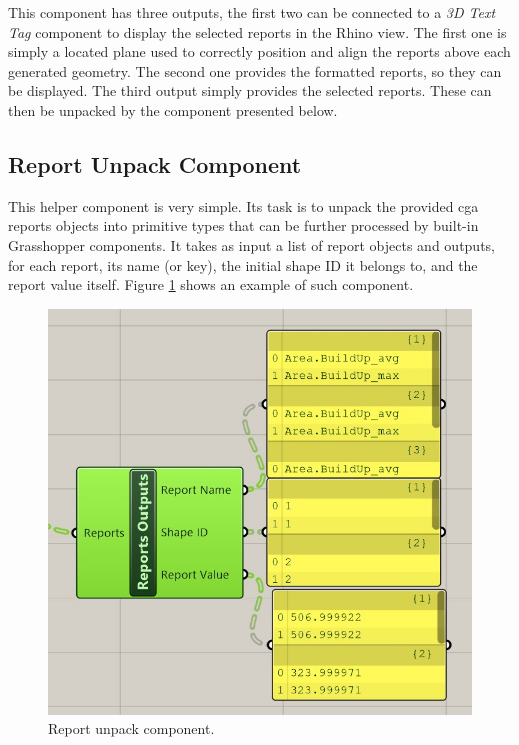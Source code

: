This component has three outputs, the first two can be connected to a \textit{3D Text Tag} component to display the selected reports in the Rhino view. The first one is simply a located plane used to correctly position and align the reports above each generated geometry. The second one provides the formatted reports, so they can be displayed. The third output simply provides the selected reports. These can then be unpacked by the component presented below.


\subsection{Report Unpack Component}

This helper component is very simple. Its task is to unpack the provided cga reports objects into primitive types that can be further processed by built-in Grasshopper components. It takes as input a list of report objects and outputs, for each report, its name (or key), the initial shape ID it belongs to, and the report value itself. Figure \ref{fig:gh_unpack_example} shows an example of such component.
\vspace{1cm}
\begin{figure}[h]
    \centering
    \includegraphics[]{res/man_gh_report_unpack_connected.jpg}
    \caption{Report unpack component.}
    \label{fig:gh_unpack_example}
\end{figure}